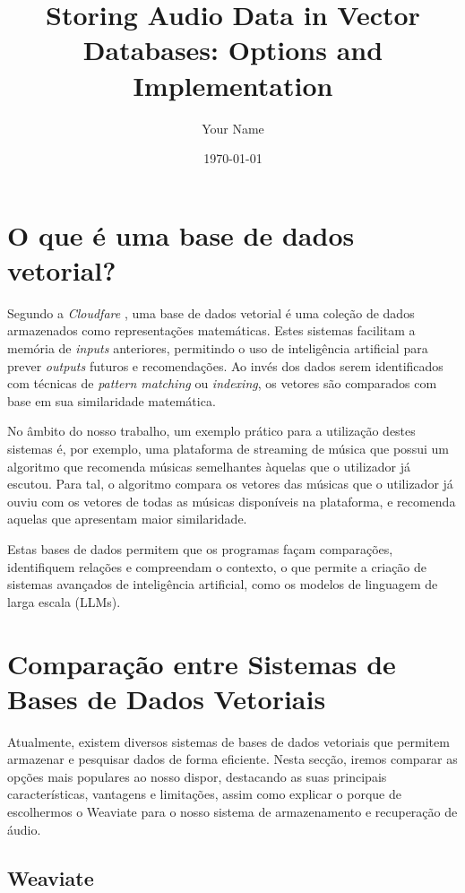 \documentclass{article}
\title{Storing Audio Data in Vector Databases: Options and Implementation}
\author{Your Name}
\date{\today}
\begin{document}
\maketitle



\section{O que é uma base de dados vetorial?}

Segundo a \textit{Cloudfare} \cite{cloudflare_vector_db}, uma base de dados vetorial é uma coleção de dados armazenados como representações matemáticas. Estes sistemas facilitam a memória de \textit{inputs} anteriores, permitindo o uso de inteligência artificial para prever \textit{outputs} futuros e recomendações. Ao invés dos dados serem identificados com técnicas de \textit{pattern matching} ou \textit{indexing}, os vetores são comparados com base em sua similaridade matemática.

No âmbito do nosso trabalho, um exemplo prático para a utilização destes sistemas é, por exemplo, uma plataforma de streaming de música que possui um algoritmo que recomenda músicas semelhantes àquelas que o utilizador já escutou. Para tal, o algoritmo compara os vetores das músicas que o utilizador já ouviu com os vetores de todas as músicas disponíveis na plataforma, e recomenda aquelas que apresentam maior similaridade.

Estas bases de dados permitem que os programas façam comparações, identifiquem relações e compreendam o contexto, o que permite a criação de sistemas avançados de inteligência artificial, como os modelos de linguagem de larga escala (LLMs).

\section{Comparação entre Sistemas de Bases de Dados Vetoriais}

Atualmente, existem diversos sistemas de bases de dados vetoriais que permitem armazenar e pesquisar dados de forma eficiente. Nesta secção, iremos comparar as opções mais populares ao nosso dispor, destacando as suas principais características, vantagens e limitações, assim como explicar o porque de escolhermos o Weaviate para o nosso sistema de armazenamento e recuperação de áudio.

\subsection{Weaviate}
\end{document}
